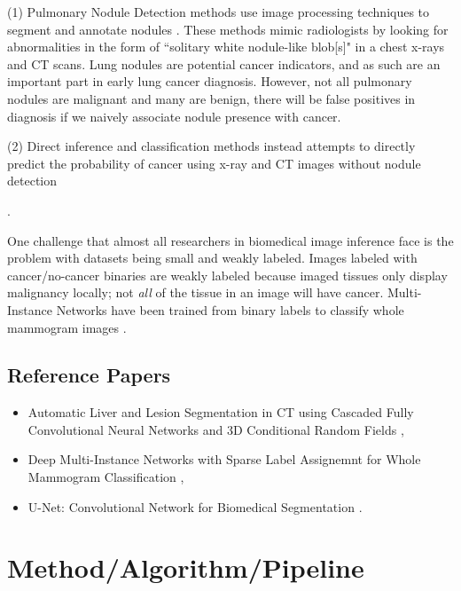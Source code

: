 \documentclass[twocolumn,10pt]{article}
\newcommand{\red}[1]{{\color{red}#1}}
\newcommand{\temp}[1]{{\red{#1}\\}}
\begin{document}
(1) Pulmonary Nodule Detection methods use 
image processing techniques to segment and annotate nodules
\cite{FeatureBasedLungNoduleDetection_2017, 
     LungNoduleDetectionWeaklyLabeled_2016, U-net_2015}. These methods
mimic radiologists by looking for abnormalities in the form of
``solitary white nodule-like blob[s]" in a chest x-rays and CT scans.
Lung nodules are potential cancer indicators, and as such are an important part 
in early lung cancer diagnosis. However, not all pulmonary nodules are malignant
and many are benign, there will be false positives in diagnosis if we naively
associate nodule presence with cancer. 

(2) Direct inference and classification methods
instead attempts to directly predict the probability of cancer using x-ray and
CT images without nodule detection

\cite{Kuruvilla_2013, classificationOfNodules_2016}. 

One challenge that almost all researchers in biomedical image inference face is 
the problem with datasets being small and weakly labeled. Images labeled with
cancer/no-cancer binaries are weakly labeled because imaged tissues only display
malignancy locally; not \textit{all} of the tissue in an image will have cancer.
Multi-Instance Networks have been trained from binary labels to classify whole
mammogram images \cite{Maron:1998:FML:302528.302753}.

\subsection{\red{Reference Papers}}
\begin{itemize}
  \item Automatic Liver and Lesion Segmentation in {CT} using Cascaded Fully
    Convolutional Neural Networks and 3D Conditional Random Fields
    \cite{DBLP:journals/corr/ChristEETBBRAHD16},
  \item Deep Multi-Instance Networks with Sparse Label Assignemnt for Whole 
    Mammogram Classification \cite{Maron:1998:FML:302528.302753},
  \item U-Net: Convolutional Network for Biomedical Segmentation
    \cite{U-net_2015}.

\end{itemize}

\section{Method/Algorithm/Pipeline}
\end{document}
